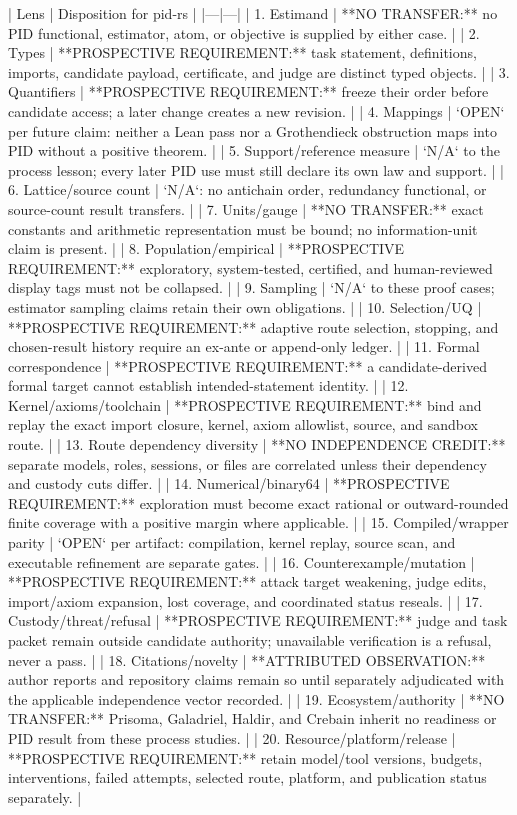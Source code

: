 \documentclass[11pt]{article}
\begin{document}
\begin{markdown}
| Lens | Disposition for pid-rs |
|---|---|
| 1. Estimand | **NO TRANSFER:** no PID functional, estimator, atom, or objective is supplied by either case. |
| 2. Types | **PROSPECTIVE REQUIREMENT:** task statement, definitions, imports, candidate payload, certificate, and judge are distinct typed objects. |
| 3. Quantifiers | **PROSPECTIVE REQUIREMENT:** freeze their order before candidate access; a later change creates a new revision. |
| 4. Mappings | `OPEN` per future claim: neither a Lean pass nor a Grothendieck obstruction maps into PID without a positive theorem. |
| 5. Support/reference measure | `N/A` to the process lesson; every later PID use must still declare its own law and support. |
| 6. Lattice/source count | `N/A`: no antichain order, redundancy functional, or source-count result transfers. |
| 7. Units/gauge | **NO TRANSFER:** exact constants and arithmetic representation must be bound; no information-unit claim is present. |
| 8. Population/empirical | **PROSPECTIVE REQUIREMENT:** exploratory, system-tested, certified, and human-reviewed display tags must not be collapsed. |
| 9. Sampling | `N/A` to these proof cases; estimator sampling claims retain their own obligations. |
| 10. Selection/UQ | **PROSPECTIVE REQUIREMENT:** adaptive route selection, stopping, and chosen-result history require an ex-ante or append-only ledger. |
| 11. Formal correspondence | **PROSPECTIVE REQUIREMENT:** a candidate-derived formal target cannot establish intended-statement identity. |
| 12. Kernel/axioms/toolchain | **PROSPECTIVE REQUIREMENT:** bind and replay the exact import closure, kernel, axiom allowlist, source, and sandbox route. |
| 13. Route dependency diversity | **NO INDEPENDENCE CREDIT:** separate models, roles, sessions, or files are correlated unless their dependency and custody cuts differ. |
| 14. Numerical/binary64 | **PROSPECTIVE REQUIREMENT:** exploration must become exact rational or outward-rounded finite coverage with a positive margin where applicable. |
| 15. Compiled/wrapper parity | `OPEN` per artifact: compilation, kernel replay, source scan, and executable refinement are separate gates. |
| 16. Counterexample/mutation | **PROSPECTIVE REQUIREMENT:** attack target weakening, judge edits, import/axiom expansion, lost coverage, and coordinated status reseals. |
| 17. Custody/threat/refusal | **PROSPECTIVE REQUIREMENT:** judge and task packet remain outside candidate authority; unavailable verification is a refusal, never a pass. |
| 18. Citations/novelty | **ATTRIBUTED OBSERVATION:** author reports and repository claims remain so until separately adjudicated with the applicable independence vector recorded. |
| 19. Ecosystem/authority | **NO TRANSFER:** Prisoma, Galadriel, Haldir, and Crebain inherit no readiness or PID result from these process studies. |
| 20. Resource/platform/release | **PROSPECTIVE REQUIREMENT:** retain model/tool versions, budgets, interventions, failed attempts, selected route, platform, and publication status separately. |


\end{markdown}
\end{document}
